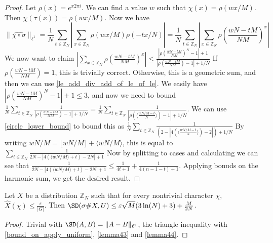 \begin{proof}
    \leanok
    Let $\rho(x) = e^{x 2\pi i}$. We can find a value $w$ such that $\chi(x) = \rho(w x / M)$. Then $\chi(\tau(x)) = \rho(w x / M)$.
    Now we have
    $$\lVert \widehat{\chi \circ \sigma}\rVert_{\ell^1} = \frac{1}{N} \sum_{t \in \mathbb{Z}_N} |\sum_{x \in \mathbb{Z}_N} \rho(w x / M) \rho(- tx/N)| =
    \frac{1}{N} \sum_{t \in \mathbb{Z}_N} |\sum_{x \in \mathbb{Z}_N} \rho(\frac{w N - t M}{N M})^x|$$
    We now want to claim $|\sum_{x \in \mathbb{Z}_N} \rho(\frac{w N - t M}{N M})^x| \leq
        \frac{|\rho(\frac{w N - t M}{N M})^N - 1| + 1}{|\rho(\frac{w N - t M}{N M}) - 1| + 1/N}$
    If $\rho(\frac{w N - t M}{N M}) = 1$, this is trivially correct. Otherwise, this is a geometric sum, and then we can use
    \ref{le_add_div_add_of_le_of_le}.
    We easily have $|\rho(\frac{w N - t M}{N M})^N - 1| + 1 \leq 3$, and now we need to bound
    $\frac1N\sum_{t \in \mathbb{Z}_N} \frac1{|\rho(\frac{w N - t M}{N M}) - 1| + 1/N} = \frac1N\sum_{t \in \mathbb{Z}_N} \frac1{|\rho(\langle\frac{w N / M - t}{N}\rangle) - 1| + 1/N}$.
    We can use \ref{circle_lower_bound} to bound this as $\frac1N\sum_{t \in \mathbb{Z}_N} \frac1{(2 - |4(\langle\frac{w N / M - t}{N}\rangle) - 2|) + 1/N}$
    By writing $w N / M = \lfloor w N / M \rfloor + \langle w N / M \rangle$, this is equal to
    $\sum_{t \in \mathbb{Z}_N} \frac1{2N - |4(\langle{w N / M}\rangle + t) - 2N| + 1}$
    Now by splitting to cases and calculating we can see that $\frac1{2N - |4(\langle{w N / M}\rangle + t) - 2N| + 1} \leq \frac1{4t+1} + \frac1{4(n-1-t)+1}$.
    Applying bonuds on the harmonic sum, we get the desired result.
\end{proof}

\begin{theorem}
    \label{generalized_XOR_lemma}
    \leanok
    Let $X$ be a distribution $\mathbb{Z}_N$ such that for every nontrivial character $\chi$,
    $\hat{X}(\chi) \leq \frac{\varepsilon}{|G|}$. Then $\SD(\sigma \# X, U) \leq \varepsilon \sqrt{M} (3\ln(N) + 3) + \frac{M}{2N}$.
\end{theorem}

\begin{proof}
    \leanok
    Trivial with $\SD(A, B) = \lVert A - B \rVert_{\ell^1}$, the triangle inequality with \ref{bound_on_apply_uniform}, \ref{lemma43} and \ref{lemma44}.
\end{proof}

